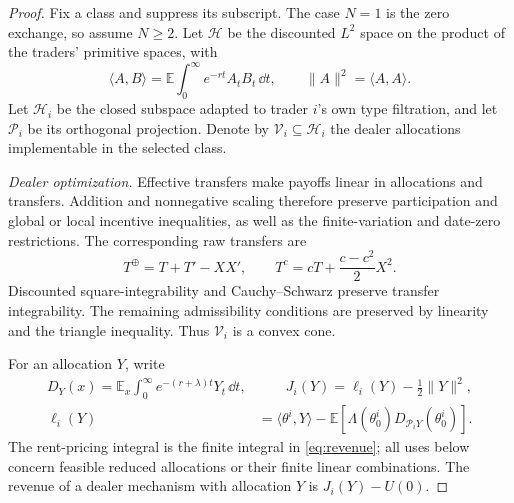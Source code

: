 \documentclass[12pt]{article}
\newcommand{\E}{\mathbb{E}}
\begin{document}
\begin{proof}
Fix a class and suppress its subscript. The case \(N=1\) is the zero
exchange, so assume \(N\geq2\).
Let \(\mathcal H\) be the discounted \(L^2\) space on the product of
the traders' primitive spaces, with
\[
  \langle A,B\rangle=\E\int_0^\infty e^{-rt}A_tB_t\,\dd t,
  \qquad \|A\|^2=\langle A,A\rangle .
\]
Let \(\mathcal H_i\) be the closed subspace adapted to trader \(i\)'s
own type filtration, and let \(\mathcal P_i\) be its orthogonal
projection. Denote by \(\mathcal V_i\subseteq\mathcal H_i\) the dealer
allocations implementable in the selected class.

\emph{Dealer optimization.}
Effective transfers make payoffs linear in allocations and transfers.
Addition and nonnegative scaling therefore preserve participation and
global or local incentive inequalities, as well as the finite-variation
and date-zero restrictions. The corresponding raw transfers are
\[
  T^\oplus=T+T'-XX',
  \qquad
  T^c=cT+\frac{c-c^2}{2}X^2 .
\]
Discounted square-integrability and Cauchy--Schwarz preserve transfer
integrability. The remaining admissibility conditions are preserved
by linearity and the triangle inequality. Thus \(\mathcal V_i\) is
a convex cone.

For an allocation \(Y\), write
\[
\begin{aligned}
  D_Y(x)=\E_x\int_0^\infty e^{-(r+\lambda)t}Y_t\,\dd t,
  &\qquad J_i(Y)=\ell_i(Y)-\frac12\|Y\|^2,\\
  \ell_i(Y)&=\langle\theta^i,Y\rangle
       -\E[\Lambda(\theta_0^i)D_{\mathcal P_iY}(\theta_0^i)].
\end{aligned}
\]
The rent-pricing integral is the finite integral in
\eqref{eq:revenue}; all uses below concern feasible reduced allocations
or their finite linear combinations.
The revenue of a dealer mechanism with allocation \(Y\) is
\(J_i(Y)-U(0)\).


\end{proof}
\end{document}
